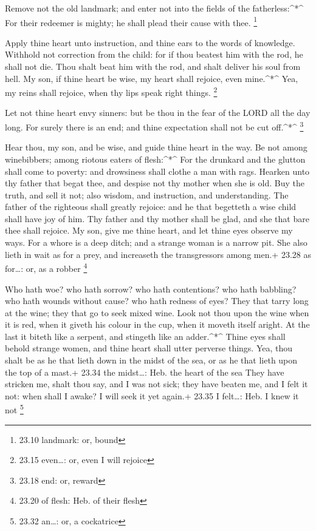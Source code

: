  Remove not the old landmark; and enter not into the fields
of the fatherless:\^{}*\^{}  For their redeemer is mighty;
he shall plead their cause with thee. \footnote{23.10 landmark: or,
  bound}

 Apply thine heart unto instruction, and thine ears to the
words of knowledge.  Withhold not correction from the
child: for if thou beatest him with the rod, he shall not die.
 Thou shalt beat him with the rod, and shalt deliver his
soul from hell.  My son, if thine heart be wise, my heart
shall rejoice, even mine.\^{}*\^{}  Yea, my reins shall
rejoice, when thy lips speak right things. \footnote{23.15 even\ldots:
  or, even I will rejoice}

 Let not thine heart envy sinners: but be thou in the fear
of the LORD all the day long.  For surely there is an end;
and thine expectation shall not be cut off.\^{}*\^{} \footnote{23.18
  end: or, reward}

 Hear thou, my son, and be wise, and guide thine heart in
the way.  Be not among winebibbers; among riotous eaters of
flesh:\^{}*\^{}  For the drunkard and the glutton shall
come to poverty: and drowsiness shall clothe a man with rags.
 Hearken unto thy father that begat thee, and despise not
thy mother when she is old.  Buy the truth, and sell it
not; also wisdom, and instruction, and understanding.  The
father of the righteous shall greatly rejoice: and he that begetteth a
wise child shall have joy of him.  Thy father and thy
mother shall be glad, and she that bare thee shall rejoice.
 My son, give me thine heart, and let thine eyes observe my
ways.  For a whore is a deep ditch; and a strange woman is
a narrow pit.  She also lieth in wait as for a prey, and
increaseth the transgressors among men.+ 23.28 as for\ldots: or, as a
robber \footnote{23.20 of flesh: Heb. of their flesh}

 Who hath woe? who hath sorrow? who hath contentions? who
hath babbling? who hath wounds without cause? who hath redness of eyes?
 They that tarry long at the wine; they that go to seek
mixed wine.  Look not thou upon the wine when it is red,
when it giveth his colour in the cup, when it moveth itself aright.
 At the last it biteth like a serpent, and stingeth like an
adder.\^{}*\^{}  Thine eyes shall behold strange women, and
thine heart shall utter perverse things.  Yea, thou shalt
be as he that lieth down in the midst of the sea, or as he that lieth
upon the top of a mast.+ 23.34 the midst\ldots: Heb. the heart of the
sea  They have stricken me, shalt thou say, and I was not
sick; they have beaten me, and I felt it not: when shall I awake? I will
seek it yet again.+ 23.35 I felt\ldots: Heb. I knew it not \footnote{23.32
  an\ldots: or, a cockatrice}

